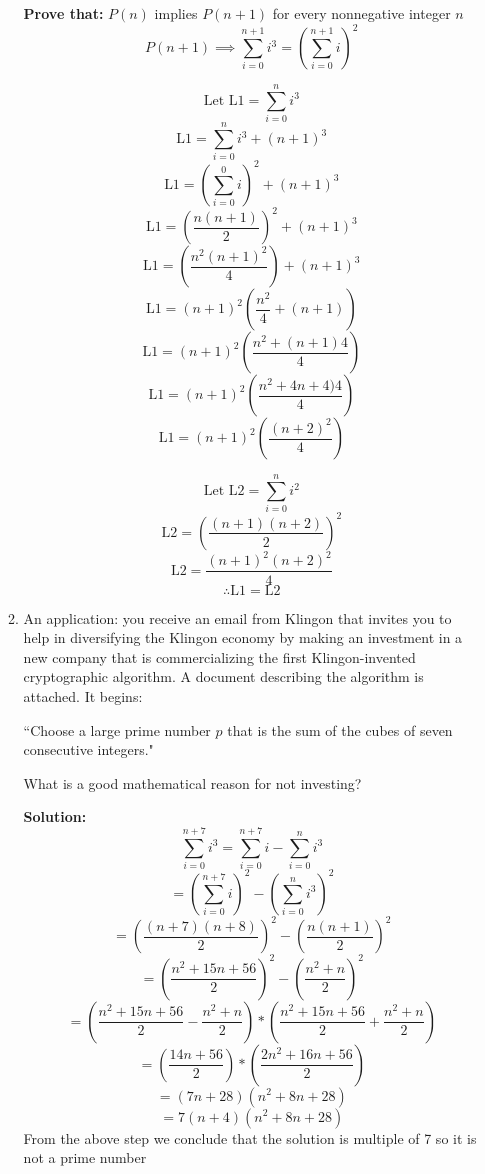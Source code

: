 \documentclass[12pt]{article}
\begin{document}
\begin{enumerate}
\begin{enumerate}
                \textbf{Prove that: } $P(n)$ implies $P(n + 1)$ for every nonnegative integer $n$
                \[ P(n + 1) \implies \sum_{i=0}^{n+1}i^{3}=\left( \sum_{i=0}^{n+1}i \right)^{2} \]

                \[ \text {Let L1} = \sum_{i=0}^{n}i^{3} \]
                \[ \text {L1} = \sum_{i=0}^{n}i^{3} + (n + 1)^3 \]
                \[ \text {L1} = \left( \sum_{i=0}^{0}i \right)^{2} + (n + 1)^3\]
                \[ \text {L1} = \left(\frac{n(n+1)}{2} \right)^2 + (n + 1)^3 \]
                \[ \text {L1} = (\frac{n^2(n+1)^2}{4}) + (n + 1)^3 \]
                \[ \text {L1} = (n + 1)^2 (\frac{n^2}{4} + (n + 1))\]
                \[ \text {L1} = (n + 1)^2 (\frac{n^2 + (n+1)4}{4})\]
                \[ \text {L1} = (n + 1)^2 (\frac{n^2 + 4n + 4)4}{4})\]
                \[ \text {L1} = (n + 1)^2 (\frac{(n + 2)^2}{4})\]

                \[ \text {Let L2} = \sum_{i=0}^{n}i^{2} \]
                \[ \text {L2} = (\frac{(n + 1)(n + 2)}{2})^2\]
                \[ \text {L2} = \frac{(n + 1)^2(n + 2)^2}{4}\]
                \[ \therefore \text {L1} = \text {L2} \]
            \item An application: you receive an email from Klingon that invites you to help in diversifying the Klingon economy by making an investment in a new company that is commercializing the first Klingon-invented cryptographic algorithm. A document describing the algorithm is attached. It begins:

                ``Choose a large prime number $p$ that is the sum of the cubes of seven consecutive integers."

                What is a good mathematical reason for not investing?

                \textbf{Solution: } 
                \[ \sum_{i=0}^{n+7}i^{3}= \sum_{i=0}^{n+7}i - \sum_{i=0}^{n}i^{3}\]
                \[ = (\sum_{i=0}^{n+7}i)^{2} - (\sum_{i=0}^{n}i^{3})^{2} \]
                \[ = (\frac{(n+7)(n+8)}{2})^{2} - (\frac{n(n+1)}{2})^{2} \]
                \[ = (\frac{n^2+15n+56}{2})^{2} - (\frac{n^2+n}{2})^{2} \]
                \[ = (\frac{n^2+15n+56}{2} - \frac{n^2+n}{2}) * (\frac{n^2+15n+56}{2} + \frac{n^2+n}{2}) \]
                \[ = (\frac{14n+56}{2}) * (\frac{2{n}^2+16n+56}{2}) \]
                \[ = (7n+28)(n^2+8n+28) \]
                \[ = 7(n+4)(n^2+8n+28) \]
                From the above step we conclude that the solution is multiple of 7 so it is not a prime number

        \end{enumerate}

\end{enumerate}

\pagebreak
\end{document}
